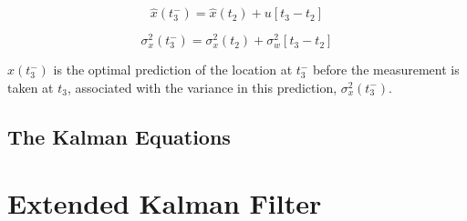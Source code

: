 \begin{equation}\label{}
  \hat{x}(t^-_3)=\hat{x}(t_2)+u[t_3-t_2]
\end{equation}

\begin{equation}\label{}
  \sigma^2_x(t^-_3)=\sigma^2_x(t_2)+\sigma^2_w[t_3-t_2]
\end{equation}

\noindent
$\hat{x}(t^-_3)$ is the optimal prediction of the location at $t^-_3$ before the measurement is taken at $t_3$, associated with the variance in this prediction, $\sigma^2_x(t^-_3)$.

\subsection{The Kalman Equations}


\section{Extended Kalman Filter}


